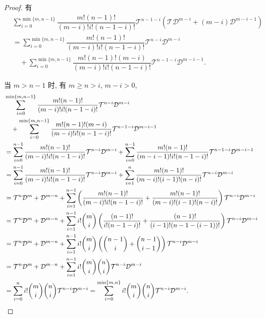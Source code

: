 \documentclass[color=black,device=normal,lang=cn,mode=geye]{elegantnote}
\begin{document}
\begin{proof}
    有
    \begin{align*}
        & \sum\limits_{i=0}^{\min\{m,n-1\}}\dfrac{m!(n-1)!}{(m-i)!i!(n-1-i)!}\mathcal{T}^{n-1-i}(\mathcal{T}\mathcal{D}^{m-i}+(m-i)\mathcal{D}^{m-i-1}) \\
        & =\sum\limits_{i=0}^{\min\{m,n-1\}}\dfrac{m!(n-1)!}{(m-i)!i!(n-1-i)!}\mathcal{T}^{n-i}\mathcal{D}^{m-i} \\
        & \quad+\sum\limits_{i=0}^{\min\{m,n-1\}}\dfrac{m!(n-1)!(m-i)}{(m-i)!i!(n-1-i)!}\mathcal{T}^{n-1-i}\mathcal{D}^{m-i-1}.
    \end{align*}

    当 $m>n-1$ 时, 有 $m\geq n>i$, $m-i>0$,
    \begin{align*}
        & \sum\limits_{i=0}^{\min\{m,n-1\}}\dfrac{m!(n-1)!}{(m-i)!i!(n-1-i)!}\mathcal{T}^{n-i}\mathcal{D}^{m-i} \\
        & \quad+\sum\limits_{i=0}^{\min\{m,n-1\}}\dfrac{m!(n-1)!(m-i)}{(m-i)!i!(n-1-i)!}\mathcal{T}^{n-1-i}\mathcal{D}^{m-i-1} \\
        & =\sum\limits_{i=0}^{n-1}\dfrac{m!(n-1)!}{(m-i)!i!(n-1-i)!}\mathcal{T}^{n-i}\mathcal{D}^{m-i}+\sum\limits_{i=0}^{n-1}\dfrac{m!(n-1)!}{(m-i-1)!i!(n-1-i)!}\mathcal{T}^{n-1-i}\mathcal{D}^{m-i-1} \\
        & =\sum\limits_{i=0}^{n-1}\dfrac{m!(n-1)!}{(m-i)!i!(n-1-i)!}\mathcal{T}^{n-i}\mathcal{D}^{m-i}+\sum\limits_{i=1}^n\dfrac{m!(n-1)!}{(m-i)!(i-1)!(n-i)!}\mathcal{T}^{n-i}\mathcal{D}^{m-i} \\
        & =\mathcal{T}^{n}\mathcal{D}^{m}+\mathcal{D}^{m-n}+\sum\limits_{i=1}^{n-1}\left(\dfrac{m!(n-1)!}{(m-i)!i!(n-1-i)!}+\dfrac{m!(n-1)!}{(m-i)!(i-1)!(n-i)!}\right)\mathcal{T}^{n-i}\mathcal{D}^{m-i} \\
        & =\mathcal{T}^{n}\mathcal{D}^{m}+\mathcal{D}^{m-n}+\sum\limits_{i=1}^{n-1}i!\dbinom{m}{i}\left(\dfrac{(n-1)!}{i!(n-1-i)!}+\dfrac{(n-1)!}{(i-1)!(n-1-(i-1))!}\right)\mathcal{T}^{n-i}\mathcal{D}^{m-i} \\
        & =\mathcal{T}^{n}\mathcal{D}^{m}+\mathcal{D}^{m-n}+\sum\limits_{i=1}^{n-1}i!\dbinom{m}{i}\left(\dbinom{n-1}{i}+\dbinom{n-1}{i-1}\right)\mathcal{T}^{n-i}\mathcal{D}^{m-i} \\
        & =\mathcal{T}^{n}\mathcal{D}^{m}+\mathcal{D}^{m-n}+\sum\limits_{i=1}^{n-1}i!\dbinom{m}{i}\dbinom{n}{i}\mathcal{T}^{n-i}\mathcal{D}^{m-i} \\
        & =\sum\limits_{i=0}^ni!\dbinom{m}{i}\dbinom{n}{i}\mathcal{T}^{n-i}\mathcal{D}^{m-i}=\sum\limits_{i=0}^{\min\{m,n\}}i!\dbinom{m}{i}\dbinom{n}{i}\mathcal{T}^{n-i}\mathcal{D}^{m-i}.
    \end{align*}


\end{proof}
\end{document}
